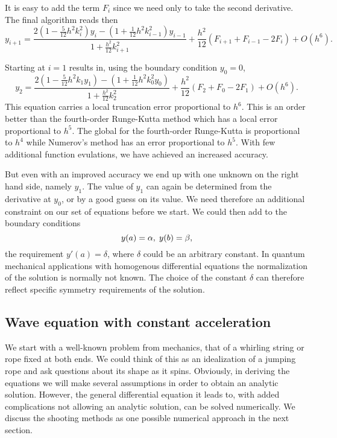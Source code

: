 It is easy to add the term $F_i$ since we need only to take the second derivative.
The final algorithm reads then 
\[
y_{i+1} =
    \frac{2 \left ( 1 - \frac{5}{12} h^2 k^2_{i}\right )y_{i}
            - \left ( 1 + \frac{1}{12} h^2 k^2_{i-1}  \right )y_{i-1}}
             {1 + \frac{h^2}{12} k^2_{i+1}}+\frac{h^2}{12}\left(F_{i+1}+F_{i-1}-2F_i\right)+O(h^6).
\]

Starting at $i=1$ results in, using the boundary condition $y_0=0$, 
\[
y_{2} =
    \frac{2 \left ( 1 - \frac{5}{12} h^2 k_{1}y_{1}
                                                             \right )
            - \left ( 1 + \frac{1}{12} h^2 k^2_{0} y_{0} \right )}
             {1 + \frac{h^2}{12} k^2_{2}}+\frac{h^2}{12}\left(F_{2}+F_{0}-2F_1\right)+O(h^6).
\label{num-9}
\]
This equation carries a local truncation error proportional to $h^6$. 
This is an order better than the fourth-order Runge-Kutta method which has a local 
error proportional to  $h^5$.  The global for the fourth-order Runge-Kutta is proportional 
to $h^4$ while Numerov's method has an error proportional to $h^5$.  With few additional function
evulations, we have achieved an increased accuracy.  


But even with an improved 
accuracy we end up with one unknown on the right hand side, namely $y_1$. 
The value of $y_1$ can again be determined from the derivative at $y_0$, or by a
good guess on its value. We need therefore an additional constraint on our set of equations
before we start. We could then add to the boundary conditions
\[
  y(a)= \alpha , \hspace{0.1cm}  y(b) = \beta,
\]
the requirement $y'(a)=\delta$, where $\delta$ could be an arbitrary constant.
In quantum mechanical applications with homogenous differential equations the normalization of the solution is 
normally not known. The choice of the constant $\delta$ can therefore reflect specific symmetry requirements
of the solution.



\subsection{Wave equation with constant acceleration}

We start  with a well-known problem from mechanics, that of a whirling string or rope
fixed at both ends. We could think of this as an idealization of a jumping rope and ask  
questions about its shape as it spins. Obviously, in deriving the equations we will make several
assumptions in order to obtain an analytic solution. However, the general differential
equation it leads to, with added complications not allowing an analytic solution, 
can be solved numerically. We discuss the shooting methods as one possible numerical approach
in the next section.

